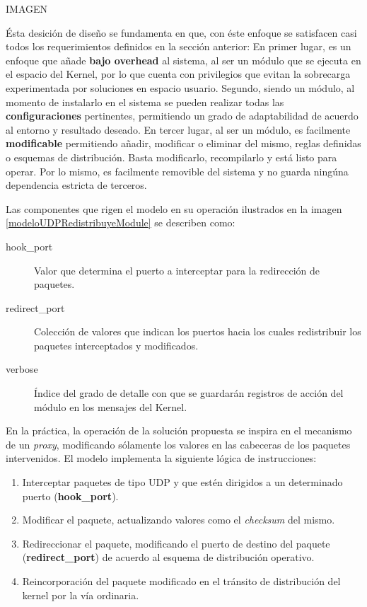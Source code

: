 IMAGEN

Ésta desición de diseño se fundamenta en que, con éste enfoque se satisfacen casi todos los requerimientos definidos en la sección anterior: En primer lugar, es un enfoque que añade \textbf{bajo overhead} al sistema, al ser un módulo que se ejecuta en el espacio del Kernel, por lo que cuenta con privilegios que evitan la sobrecarga experimentada por soluciones en espacio usuario. Segundo, siendo un módulo, al momento de instalarlo en el sistema se pueden realizar todas las \textbf{configuraciones} pertinentes, permitiendo un grado de adaptabilidad de acuerdo al entorno y resultado deseado. En tercer lugar, al ser un módulo, es facilmente \textbf{modificable} permitiendo añadir, modificar o eliminar del mismo, reglas definidas o esquemas de distribución. Basta modificarlo, recompilarlo y está listo para operar. Por lo mismo, es facilmente removible del sistema y no guarda ningúna dependencia estricta de terceros.

Las componentes que rigen el modelo en su operación ilustrados en la imagen \ref{modeloUDPRedistribuyeModule} se describen como:

\begin{description}
\item[hook\_port] Valor que determina el puerto a interceptar para la redirección de paquetes.
\item[redirect\_port] Colección de valores que indican los puertos hacia los cuales redistribuir los paquetes interceptados y modificados.
\item[verbose] Índice del grado de detalle con que se guardarán registros de acción del módulo en los mensajes del Kernel.
\end{description}

En la práctica, la operación de la solución propuesta se inspira en el mecanismo de un \emph{proxy}, modificando sólamente los valores en las cabeceras de los paquetes intervenidos. El modelo implementa la siguiente lógica de instrucciones:

\begin{enumerate}
\item Interceptar paquetes de tipo UDP y que estén dirigidos a un determinado puerto (\textbf{hook\_port}).
\item Modificar el paquete, actualizando valores como el \emph{checksum} del mismo.
\item Redireccionar el paquete, modificando el puerto de destino del paquete (\textbf{redirect\_port}) de acuerdo al esquema de distribución operativo.
\item Reincorporación del paquete modificado en el tránsito de distribución del kernel por la vía ordinaria.
\end{enumerate}


